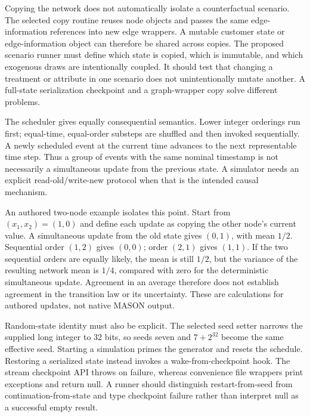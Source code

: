 Copying the network does not automatically isolate a counterfactual scenario. The selected copy routine reuses node objects and passes the same edge-information references into new edge wrappers. A mutable customer state or edge-information object can therefore be shared across copies. The proposed scenario runner must define which state is copied, which is immutable, and which exogenous draws are intentionally coupled. It should test that changing a treatment or attribute in one scenario does not unintentionally mutate another. A full-state serialization checkpoint and a graph-wrapper copy solve different problems.~\citep{exec25_jnet_mason}

The scheduler gives equally consequential semantics. Lower integer orderings run first; equal-time, equal-order substeps are shuffled and then invoked sequentially. A newly scheduled event at the current time advances to the next representable time step. Thus a group of events with the same nominal timestamp is not necessarily a simultaneous update from the previous state. A simulator needs an explicit read-old/write-new protocol when that is the intended causal mechanism.~\citep{exec25_jnet_mason}

An authored two-node example isolates this point. Start from $(x_1,x_2)=(1,0)$ and define each update as copying the other node's current value. A simultaneous update from the old state gives $(0,1)$, with mean $1/2$. Sequential order $(1,2)$ gives $(0,0)$; order $(2,1)$ gives $(1,1)$. If the two sequential orders are equally likely, the mean is still $1/2$, but the variance of the resulting network mean is $1/4$, compared with zero for the deterministic simultaneous update. Agreement in an average therefore does not establish agreement in the transition law or its uncertainty. These are calculations for authored updates, not native MASON output.~\citep{exec25_jnet_choice}

Random-state identity must also be explicit. The selected seed setter narrows the supplied long integer to 32 bits, so seeds seven and $7+2^{32}$ become the same effective seed. Starting a simulation primes the generator and resets the schedule. Restoring a serialized state instead invokes a wake-from-checkpoint hook. The stream checkpoint API throws on failure, whereas convenience file wrappers print exceptions and return null. A runner should distinguish restart-from-seed from continuation-from-state and type checkpoint failure rather than interpret null as a successful empty result.~\citep{exec25_jnet_mason,exec25_jnet_choice}

